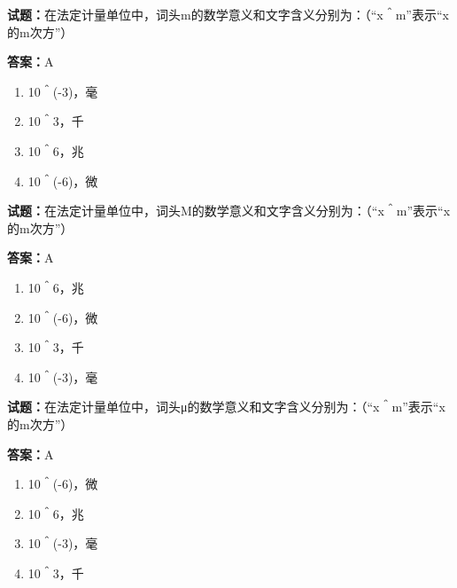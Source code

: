 \documentclass{ctexbook}
\begin{document}




\vspace{1em}

\textbf{试题：}在法定计量单位中，词头m的数学意义和文字含义分别为：（“x＾m”表示“x的m次方”） 

\textbf{答案：}A 

\begin{enumerate}[leftmargin=3em]
  \item 10＾(-3)，毫 

  \item 10＾3，千 

  \item 10＾6，兆 

  \item 10＾(-6)，微 


\end{enumerate}





\vspace{1em}

\textbf{试题：}在法定计量单位中，词头M的数学意义和文字含义分别为：（“x＾m”表示“x的m次方”） 

\textbf{答案：}A 

\begin{enumerate}[leftmargin=3em]
  \item 10＾6，兆 

  \item 10＾(-6)，微 

  \item 10＾3，千 

  \item 10＾(-3)，毫 

\end{enumerate}





\vspace{1em}

\textbf{试题：}在法定计量单位中，词头μ的数学意义和文字含义分别为：（“x＾m”表示“x的m次方”） 

\textbf{答案：}A 

\begin{enumerate}[leftmargin=3em]
  \item 10＾(-6)，微 

  \item 10＾6，兆 

  \item 10＾(-3)，毫 

  \item 10＾3，千 

\end{enumerate}
\end{document}
